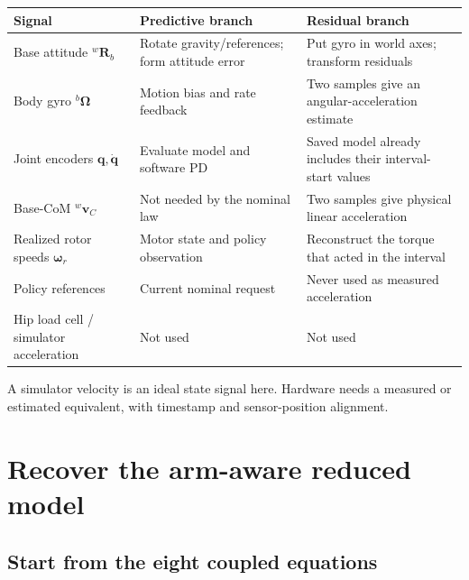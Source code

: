 \documentclass[11pt,a4paper]{article}
\newcommand{\vct}[1]{\boldsymbol{#1}}
\newcommand{\mat}[1]{\mathbf{#1}}
\newcommand{\bv}[1]{{}^{b}\vct{#1}}
\newcommand{\wv}[1]{{}^{w}\vct{#1}}
\newcommand{\Rw}{{}^{w}\mat R_b}
\begin{document}
\begin{longtable}{L{3.4cm}L{5.3cm}L{6.1cm}}
\toprule Signal & Predictive branch & Residual branch\\\midrule\endhead
Base attitude $\Rw$ & Rotate gravity/references; form attitude error & Put gyro in world axes; transform residuals\\
Body gyro $\bv\Omega$ & Motion bias and rate feedback & Two samples give an angular-acceleration estimate\\
Joint encoders $\vct q,\dot{\vct q}$ & Evaluate model and software PD & Saved model already includes their interval-start values\\
Base-CoM $\wv v_C$ & Not needed by the nominal law & Two samples give physical linear acceleration\\
Realized rotor speeds $\vct\omega_r$ & Motor state and policy observation & Reconstruct the torque that acted in the interval\\
Policy references & Current nominal request & Never used as measured acceleration\\
Hip load cell / simulator acceleration & Not used & Not used\\\bottomrule
\end{longtable}
A simulator velocity is an ideal state signal here. Hardware needs a measured or
estimated equivalent, with timestamp and sensor-position alignment.

\section{Recover the arm-aware reduced model}\label{sec:model}

\subsection{Start from the eight coupled equations}
\end{document}
